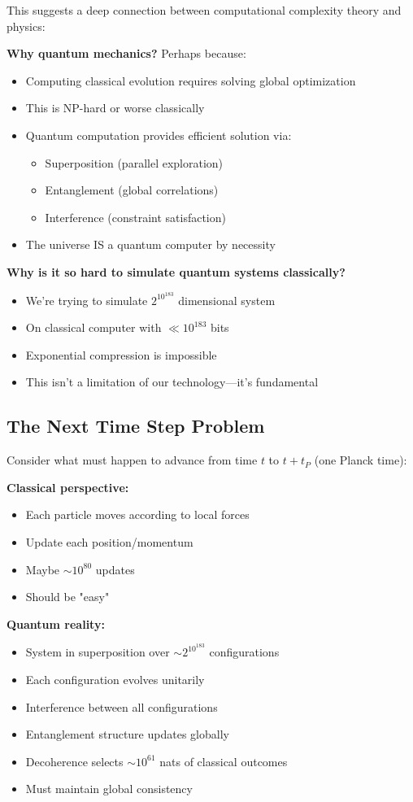 This suggests a deep connection between computational complexity theory and physics:

\textbf{Why quantum mechanics?}
Perhaps because:
\begin{itemize}
\item Computing classical evolution requires solving global optimization
\item This is NP-hard or worse classically
\item Quantum computation provides efficient solution via:
  \begin{itemize}
  \item Superposition (parallel exploration)
  \item Entanglement (global correlations)
  \item Interference (constraint satisfaction)
  \end{itemize}
\item The universe IS a quantum computer by necessity
\end{itemize}

\textbf{Why is it so hard to simulate quantum systems classically?}
\begin{itemize}
\item We're trying to simulate $2^{10^{183}}$ dimensional system
\item On classical computer with $\ll 10^{183}$ bits
\item Exponential compression is impossible
\item This isn't a limitation of our technology—it's fundamental
\end{itemize}

\subsection{The Next Time Step Problem}

Consider what must happen to advance from time $t$ to $t + t_P$ (one Planck time):

\textbf{Classical perspective:} 
\begin{itemize}
\item Each particle moves according to local forces
\item Update each position/momentum
\item Maybe $\sim 10^{80}$ updates
\item Should be "easy"
\end{itemize}

\textbf{Quantum reality:}
\begin{itemize}
\item System in superposition over $\sim 2^{10^{183}}$ configurations
\item Each configuration evolves unitarily
\item Interference between all configurations
\item Entanglement structure updates globally
\item Decoherence selects $\sim 10^{61}$ nats of classical outcomes
\item Must maintain global consistency
\end{itemize}


